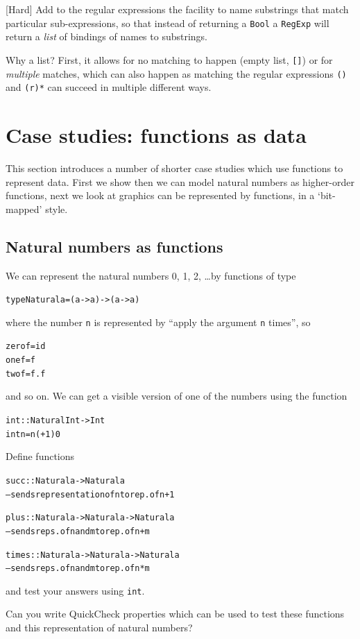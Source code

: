 \begin{exercises}
\item {[Hard]}
Add to the regular expressions the facility to name substrings that match particular sub-expressions, so that instead of returning a \texttt{Bool} a \texttt{RegExp} will return a \emph{list} of bindings of names to substrings. 

Why a list? First, it allows for no matching to happen (empty list, \texttt{[]}) or for \emph{multiple} matches, which can also happen as matching the regular expressions \texttt{(\rone\rtwo)} and \texttt{(r)*} can succeed in multiple different ways.

\end{exercises}


\section{Case studies: functions as data}

This section introduces a number of shorter case studies which use functions to represent data. First we show then we can model natural numbers as higher-order functions, next we look at graphics can be represented by functions, in a `bit-mapped' style.


\subsection*{Natural numbers as functions}

We can represent the natural numbers 0, 1, 2, \ldots by functions of type 
\begin{alltt}
type Natural a = (a -> a) -> (a -> a)
\end{alltt}
where the number \texttt{n} is represented by ``apply the argument \texttt{n} times'', so
\begin{alltt}
zero f = id
one f  = f
two f  = f.f
\end{alltt}
and so on. We can get a visible version of one of the numbers using the function
\begin{alltt}
int :: Natural Int -> Int
int n = n (+1) 0
\end{alltt}

\begin{exercises}

\item
Define functions 
\begin{alltt}
succ :: Natural a -> Natural a
  -- sends representation of n to rep. of n+1

plus :: Natural a -> Natural a -> Natural a
  -- sends reps. of n and m to rep. of n+m

times :: Natural a -> Natural a -> Natural a
  -- sends reps. of n and m to rep. of n*m
\end{alltt}
and test your answers using \texttt{int}. 

\item
Can you write QuickCheck properties which can be used to test these functions and this representation of natural numbers?
\end{exercises}

